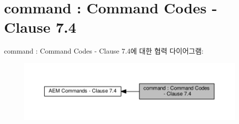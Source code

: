 \hypertarget{group__command}{}\section{command \+: Command Codes -\/ Clause 7.4}
\label{group__command}
command \+: Command Codes -\/ Clause 7.4에 대한 협력 다이어그램\+:
\nopagebreak
\begin{figure}[H]
\begin{center}
\leavevmode
\includegraphics[width=350pt]{group__command}
\end{center}
\end{figure}
